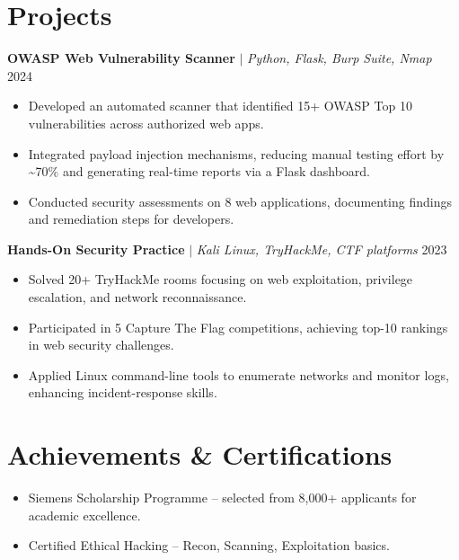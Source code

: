 \documentclass[letterpaper,11pt]{article}
\newcommand{\resumeItem}[1]{\item\small{#1}}
\begin{document}
\section*{Projects}
\textbf{OWASP Web Vulnerability Scanner} $|$ \textit{\small Python, Flask, Burp Suite, Nmap} \hfill \small 2024 \\
\begin{itemize}
  \resumeItem{Developed an automated scanner that identified 15+ OWASP Top 10 vulnerabilities across authorized web apps.}
  \resumeItem{Integrated payload injection mechanisms, reducing manual testing effort by \textasciitilde{}70\% and generating real-time reports via a Flask dashboard.}
  \resumeItem{Conducted security assessments on 8 web applications, documenting findings and remediation steps for developers.}
\end{itemize}
\textbf{Hands-On Security Practice} $|$ \textit{\small Kali Linux, TryHackMe, CTF platforms} \hfill \small 2023 \\
\begin{itemize}
  \resumeItem{Solved 20+ TryHackMe rooms focusing on web exploitation, privilege escalation, and network reconnaissance.}
  \resumeItem{Participated in 5 Capture The Flag competitions, achieving top-10 rankings in web security challenges.}
  \resumeItem{Applied Linux command-line tools to enumerate networks and monitor logs, enhancing incident-response skills.}
\end{itemize}
\section*{Achievements \& Certifications}
\begin{itemize}
  \resumeItem{Siemens Scholarship Programme -- selected from 8,000+ applicants for academic excellence.}
  \resumeItem{Certified Ethical Hacking -- Recon, Scanning, Exploitation basics.}
\end{itemize}
\end{document}
